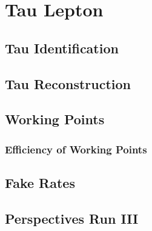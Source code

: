 \section{Tau Lepton}
\label{sec:Tau}

\subsection{Tau Identification}
\label{subsec:TauTrigger}

\subsection{Tau Reconstruction}
\label{subsec:TauReconstruction}

\subsection{Working Points}
\label{subsec:wp}

\subsubsection{Efficiency of Working Points}
\label{subsubsec:Eff_WP}

\subsection{Fake Rates}
\label{subsec:FakeRates}

\subsection{Perspectives Run III}
\label{subsec:Perspectives}